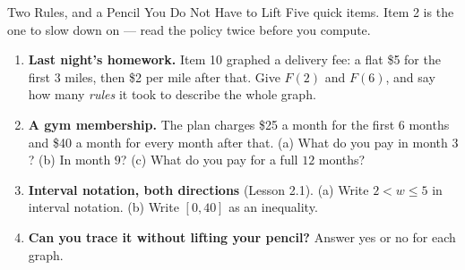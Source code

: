 \documentclass[10pt]{article}
\begin{document}

\vspace{0.15in}

\begin{notesbox}{Two Rules, and a Pencil You Do Not Have to Lift}
\small
Five quick items. Item 2 is the one to slow down on --- read the policy twice before you compute.

\begin{enumerate}[leftmargin=1.6em, itemsep=4pt, topsep=4pt]

\item \textbf{Last night's homework.} Item 10 graphed a delivery fee: a flat \$5 for the first $3$
miles, then \$2 per mile after that. Give $F(2)$ and $F(6)$, and say how many \emph{rules} it took to
describe the whole graph.


\item \textbf{A gym membership.} The plan charges \$25 a month for the first $6$ months and \$40 a
month for every month after that. \quad (a) What do you pay in month $3$? \quad (b) In month $9$?
\quad (c) What do you pay for a full $12$ months?


\item \textbf{Interval notation, both directions} (Lesson 2.1). \quad (a) Write $2 < w \le 5$ in
interval notation. \quad (b) Write $[0,40]$ as an inequality.


\item \textbf{Can you trace it without lifting your pencil?} Answer yes or no for each graph.
\smallskip


\end{enumerate}
\end{notesbox}
\end{document}
